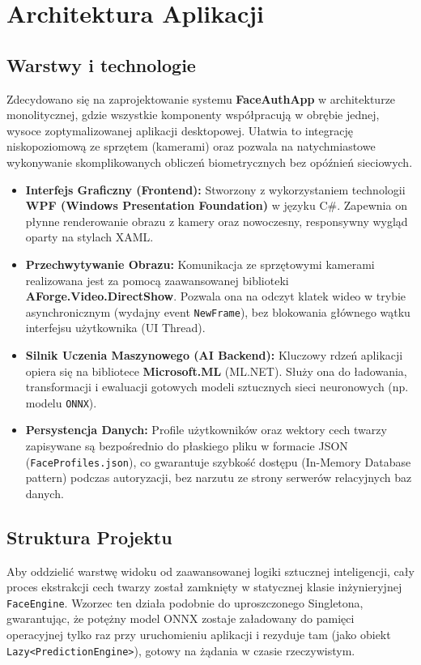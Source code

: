 \chapter{Architektura Aplikacji}

\section{Warstwy i technologie}
Zdecydowano się na zaprojektowanie systemu \textbf{FaceAuthApp} w architekturze monolitycznej, gdzie wszystkie komponenty współpracują w obrębie jednej, wysoce zoptymalizowanej aplikacji desktopowej. Ułatwia to integrację niskopoziomową ze sprzętem (kamerami) oraz pozwala na natychmiastowe wykonywanie skomplikowanych obliczeń biometrycznych bez opóźnień sieciowych.

\begin{itemize}
    \item \textbf{Interfejs Graficzny (Frontend):} Stworzony z wykorzystaniem technologii \textbf{WPF (Windows Presentation Foundation)} w języku C\#. Zapewnia on płynne renderowanie obrazu z kamery oraz nowoczesny, responsywny wygląd oparty na stylach XAML.
    \item \textbf{Przechwytywanie Obrazu:} Komunikacja ze sprzętowymi kamerami realizowana jest za pomocą zaawansowanej biblioteki \textbf{AForge.Video.DirectShow}. Pozwala ona na odczyt klatek wideo w trybie asynchronicznym (wydajny event \texttt{NewFrame}), bez blokowania głównego wątku interfejsu użytkownika (UI Thread).
    \item \textbf{Silnik Uczenia Maszynowego (AI Backend):} Kluczowy rdzeń aplikacji opiera się na bibliotece \textbf{Microsoft.ML} (ML.NET). Służy ona do ładowania, transformacji i ewaluacji gotowych modeli sztucznych sieci neuronowych (np. modelu \texttt{ONNX}).
    \item \textbf{Persystencja Danych:} Profile użytkowników oraz wektory cech twarzy zapisywane są bezpośrednio do płaskiego pliku w formacie JSON (\texttt{FaceProfiles.json}), co gwarantuje szybkość dostępu (In-Memory Database pattern) podczas autoryzacji, bez narzutu ze strony serwerów relacyjnych baz danych.
\end{itemize}

\section{Struktura Projektu}
Aby oddzielić warstwę widoku od zaawansowanej logiki sztucznej inteligencji, cały proces ekstrakcji cech twarzy został zamknięty w statycznej klasie inżynieryjnej \texttt{FaceEngine}. Wzorzec ten działa podobnie do uproszczonego Singletona, gwarantując, że potężny model ONNX zostaje załadowany do pamięci operacyjnej tylko raz przy uruchomieniu aplikacji i rezyduje tam (jako obiekt \texttt{Lazy<PredictionEngine>}), gotowy na żądania w czasie rzeczywistym.

